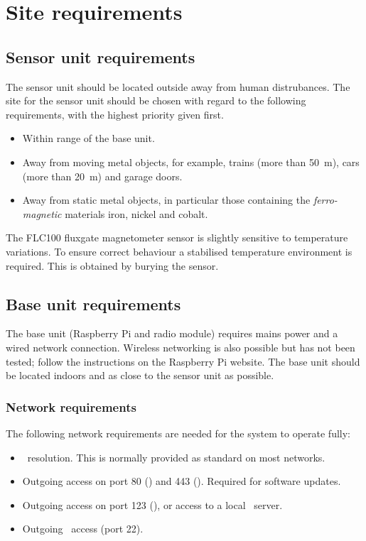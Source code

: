 \chapter{Site requirements}

\section{Sensor unit requirements}
The sensor unit should be located outside away from human
distrubances. The site for the sensor unit should be chosen with
regard to the following requirements, with the highest priority given
first.

\begin{itemize}
\item Within range of the base unit.
\item Away from moving metal objects, for example, trains (more than
  \SI{50}{\metre}), cars (more than \SI{20}{\metre}) and garage doors.
\item Away from static metal objects, in particular those containing
  the \emph{ferro-magnetic} materials iron, nickel and cobalt.
\end{itemize}

The FLC100 fluxgate magnetometer sensor is slightly sensitive to
temperature variations. To ensure correct behaviour a stabilised
temperature environment is required. This is obtained by burying the
sensor.

\section{Base unit requirements}

The base unit (Raspberry Pi and radio module) requires mains power and
a wired network connection. Wireless networking is also possible but
has not been tested; follow the instructions on the Raspberry Pi
website. The base unit should be located indoors and as close to the
sensor unit as possible.

\subsection{Network requirements}

The following network requirements are needed for the system to
operate fully:
\begin{itemize}
\item \dns\ resolution. This is normally provided
  as standard on most networks.
\item Outgoing access on port 80 (\http) and 443 (\https). Required
  for software updates.
\item Outgoing access on port 123 (\ntp), or access to a local \ntp\
  server.
\item Outgoing \ssh\ access (port 22).
\end{itemize}





